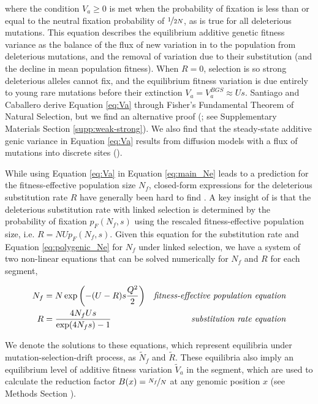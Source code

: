 \documentclass[11pt]{article}
\begin{document}
where the condition $V_a \ge 0$ is met when the probability of fixation is less
than or equal to the neutral fixation probability of $\nicefrac{1}{2N}$, as is true for all deleterious mutations. This equation describes the
equilibrium additive genetic fitness variance as the balance of the flux of new variation in to the population from deleterious mutations, and the removal of variation due to their substitution (and the decline in mean population fitness). When $R=0$, selection is so strong deleterious alleles cannot fix, and the equilibrium fitness variation is due entirely to young rare mutations before their extinction $V_a = V_a^{BGS} \approx Us$. Santiago and
Caballero derive Equation \eqref{eq:Va} through Fisher's Fundamental Theorem of
Natural Selection, but we find an alternative proof (\cite{Higgs1995-xc}; see
Supplementary Materials Section \ref{supp:weak-strong}). We also find that the
steady-state additive genic variance in Equation \eqref{eq:Va} results from
diffusion models with a flux of mutations into discrete sites
(\cite{Kimura1969-jw}). 

While using Equation \eqref{eq:Va} in Equation \eqref{eq:main_Ne} leads to a
prediction for the fitness-effective population size $N_f$, closed-form
expressions for the deleterious substitution rate $R$ have generally been hard to find
\parencite{Haigh1978-gt,Higgs1995-xc,Gessler1995-hz}. A key insight of
\textcite{Santiago2016-mu} is that the deleterious substitution rate with linked selection is determined by the probability of fixation $p_F(N_f, s)$
\parencite{Kimura1962-su,Malecot1952-qh} using the rescaled fitness-effective
population size, i.e. $R = N U p_F(N_f, s)$. Given this equation for the
substitution rate and Equation \eqref{eq:polygenic_Ne} for $N_f$ under linked selection, we have a
system of two non-linear equations that can be solved numerically for $N_f$ and
$R$ for each segment,

\begin{align}
  \label{eq:main_eqns}
  N_f &= N \exp \left( -(U-R)s \frac{Q^2}{2} \right) & \text{\emph{fitness-effective population equation}} \\
  R &= \frac{4N_f U s}{\exp(4 N_f s)-1}  & \text{\emph{substitution rate equation}}
\end{align}
%

We denote the solutions to these equations, which represent equilibria under
mutation-selection-drift process, as $\widetilde{N}_f$ and
$\widetilde{R}$. These equilibria also imply an equilibrium level of additive
fitness variation $\widetilde{V}_a$ in the segment, which are used to calculate
the reduction factor $B(x) = \nicefrac{N_f}{N}$ at any genomic position $x$
(see Methods Section ).
\end{document}
